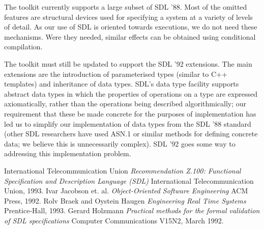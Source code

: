 The toolkit currently supports a large subset of SDL '88.
Most of the omitted features are structural devices used for specifying
a system at a variety of levels of detail. As our use of SDL
is oriented towards executions, we do not need these mechanisms.
Were they needed, similar effects can be obtained using
conditional compilation.

The toolkit must still be updated to support the SDL '92 extensions.
The main extensions are the introduction of parameterised types
(similar to C++ templates) and inheritance of data types. SDL's
data type facility supports abstract data types in which the
properties of operations on a type are expressed axiomatically,
rather than the operations being described algorithmically;
our requirement that these be made concrete for the purposes of
implementation has led us to simplify our implementation 
of data types from the SDL '88 standard (other SDL researchers
have used ASN.1 or similar methods for defining concrete data;
we believe this is unnecessarily complex).
SDL '92 goes some
way to addressing this implementation problem.

\begin{thebibliography}{9}
 International Telecommunication Union {\em Recommendation
Z.100: Functional Specification and Description Language (SDL)} 
International Telecommunication Union, 1993.
 Ivar Jacobson et. al. {\em Object-Oriented
Software Engineering} ACM Press, 1992.
 Rolv Braek and Oystein Haugen {\em Engineering Real
Time Systems} Prentice-Hall, 1993.
 Gerard Holzmann {\em Practical methods for the 
formal validation of SDL specifications} Computer Communications V15N2,
March 1992.
\end{thebibliography}




